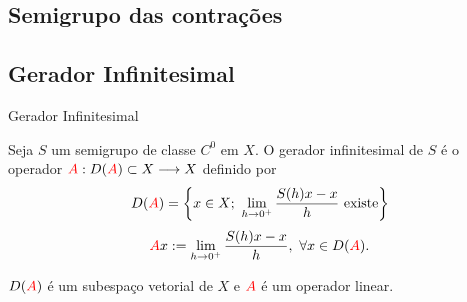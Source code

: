 \subsection*{Semigrupo das contrações}



\subsection*{Gerador Infinitesimal}
\begin{frame}{Gerador Infinitesimal }

\begin{defin}
Seja $S$ um semigrupo de classe $C^0$ em $X$. O {\color{blue}gerador infinitesimal} de $S$ é o operador ${\color{red}A}:D({\color{red}A})\subset X\longrightarrow X$ definido por 
\[D({\color{red}A})=\left\{x\in X;\ \lim\limits_{h\to 0^+} \frac{S(h)x-x}{h} \text{ existe}\right\}\]
\[\rA x:=\lim\limits_{h\to 0^+} \frac{S(h)x-x}{h},\ \forall x\in D(\rA).\]
\end{defin}
\begin{prop}
    $D({\color{red}A})$ é um subespaço vetorial de $X$ e ${\color{red}A}$ é um operador linear.
\end{prop}

\end{frame}

